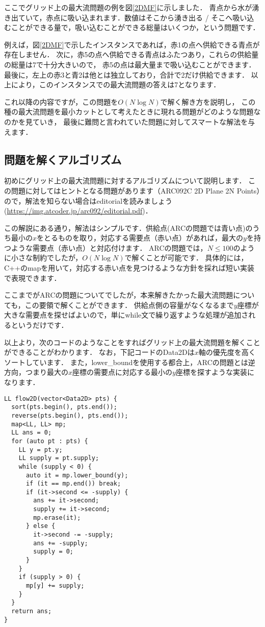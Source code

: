 \documentclass[13pt]{jarticle}
\begin{document}
ここでグリッド上の最大流問題の例を図\ref{2DMF}に示しました．
青点から水が湧き出ていて，赤点に吸い込まれます．数値はそこから湧き出る / そこへ吸い込むことができる量で，吸い込むことができる総量はいくつか，という問題です．


例えば，図\ref{2DMF}で示したインスタンスであれば，赤1の点へ供給できる青点が存在しません．
次に，赤5の点へ供給できる青点はふたつあり，これらの供給量の総量は7で十分大きいので，
赤5の点は最大量まで吸い込むことができます．
最後に，左上の赤3と青2は他とは独立しており，合計で2だけ供給できます．
以上により，このインスタンスでの最大流問題の答えは7となります．

これ以降の内容ですが，この問題を$O(N\log N)$で解く解き方を説明し，
この種の最大流問題を最小カットとして考えたときに現れる問題がどのような問題なのかを見ていき，
最後に難問と言われていた問題に対してスマートな解法を与えます．


\subsection{問題を解くアルゴリズム}

初めにグリッド上の最大流問題に対するアルゴリズムについて説明します．
この問題に対してはヒントとなる問題があります（ARC092C 2D Plane 2N Points）ので，解法を知らない場合はeditorialを読みましょう
(\url{https://img.atcoder.jp/arc092/editorial.pdf})．

この解説にある通り，解法はシンプルです．供給点(ARCの問題では青い点)のうち最小の$x$をとるものを取り，対応する需要点（赤い点）があれば，最大の$y$を持つような需要点（赤い点）と対応付けます．
ARCの問題では，$N \leq 100$のように小さな制約でしたが，$O(N \log N)$で解くことが可能です．
具体的には，C++のmapを用いて，対応する赤い点を見つけるような方針を採れば短い実装で表現できます．

ここまでがARCの問題についてでしたが，本来解きたかった最大流問題についても，この要領で解くことができます．
供給点側の容量がなくなるまで$y$座標が大きな需要点を探せばよいので，単にwhile文で繰り返すような処理が追加されるというだけです．

以上より，次のコードのようなことをすればグリッド上の最大流問題を解くことができることがわかります．
なお，下記コードのData2Dは$x$軸の優先度を高くソートしています．
また，lower\_boundを使用する都合上，ARCの問題とは逆方向，つまり最大の$x$座標の需要点に対応する最小の$y$座標を探すような実装になります．

\begin{lstlisting}[]  
LL flow2D(vector<Data2D> pts) {
  sort(pts.begin(), pts.end());
  reverse(pts.begin(), pts.end());
  map<LL, LL> mp;
  LL ans = 0;
  for (auto pt : pts) {
    LL y = pt.y;
    LL supply = pt.supply;
    while (supply < 0) {
      auto it = mp.lower_bound(y);
      if (it == mp.end()) break;
      if (it->second <= -supply) {
        ans += it->second;
        supply += it->second;
        mp.erase(it);
      } else {
        it->second -= -supply;
        ans += -supply;
        supply = 0;
      }
    }
    if (supply > 0) {
      mp[y] += supply;
    }
  }
  return ans;
}

\end{lstlisting}
\end{document}
